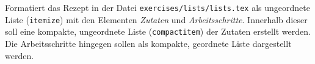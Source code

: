 Formatiert das Rezept in der Datei \texttt{exercises/lists/lists.tex} als ungeordnete Liste (\texttt{itemize}) mit den Elementen \emph{Zutaten} und \emph{Arbeitsschritte}. Innerhalb dieser soll eine kompakte, ungeordnete Liste (\texttt{compactitem}) der Zutaten erstellt werden. Die Arbeitsschritte hingegen sollen als kompakte, geordnete Liste dargestellt werden.


